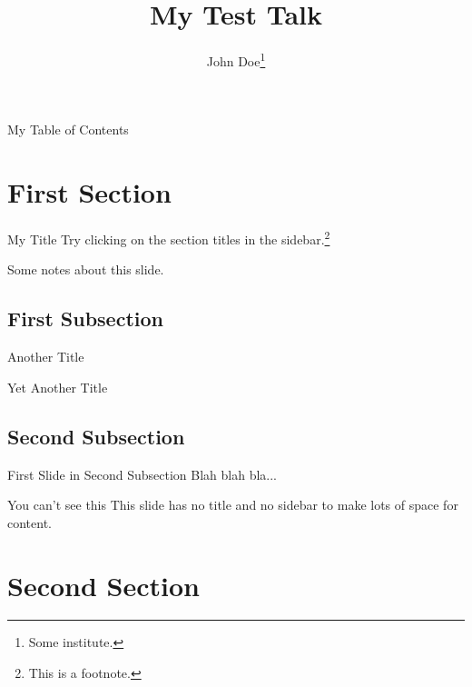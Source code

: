 \documentclass[12pt,screen]{talk}
\title{My Test Talk}
\author[John Doe]{John Doe\thanks{Some institute.}}
\begin{document}
\maketitleslide

\begin{slide}[outline]{My Table of Contents}
  \tableofcontents
\end{slide}

\section{First Section}

\begin{slide}{My Title}
  Try clicking on the section titles in the sidebar.\footnote{This is a
  footnote.}
\end{slide}
\begin{notes}
  Some notes about this slide.
\end{notes}

\subsection{First Subsection}

\begin{slide}{Another Title}
\end{slide}

\begin{slide}[nosidebar]{Yet Another Title}
\end{slide}

\subsection{Second Subsection}

\begin{slide}{First Slide in Second Subsection}
  Blah blah bla...
\end{slide}

\begin{slide}[notitle]{You can't see this}
  This slide has no title and no sidebar to make lots of space for content.
\end{slide}

\section{Second Section}
\end{document}
